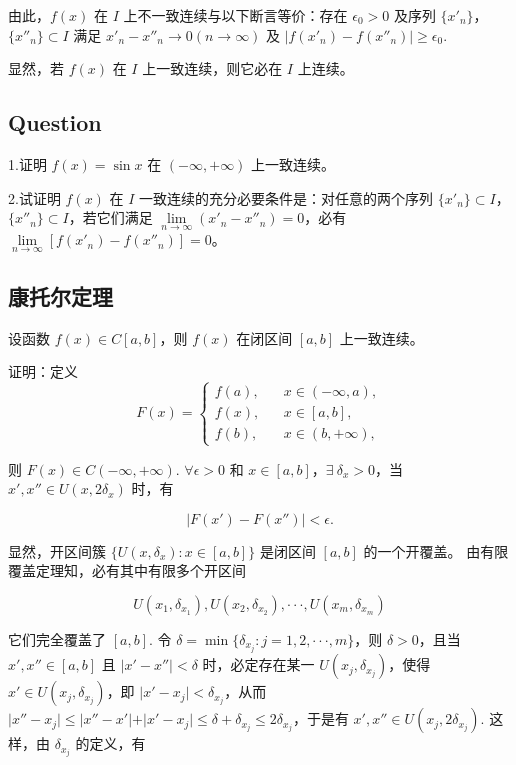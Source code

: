   由此，$f(x)$ 在 $I$ 上不一致连续与以下断言等价：存在 $\epsilon_0>0$ 及序列 $\{x'_n\}$，$\{x''_n\}\subset I$ 满足 $x'_n-x''_n\rightarrow0(n\rightarrow\infty)$ 及 $\vert f(x'_n)-f(x''_n)\vert\geq\epsilon_0$.

  显然，若 $f(x)$ 在 $I$ 上一致连续，则它必在 $I$ 上连续。

\subsection{Question}

1.证明 $f(x)=\sin x$ 在 $(-\infty,+\infty)$ 上一致连续。

2.试证明 $f(x)$ 在 $I$ 一致连续的充分必要条件是：对任意的两个序列 $\{x'_n\}\subset I$，$\{x''_n\}\subset I$，若它们满足 $\lim\limits_{n\rightarrow\infty}(x'_n-x''_n)=0$，必有 $\lim\limits_{n\rightarrow\infty}[f(x'_n)-f(x''_n)]=0$。

\subsection{康托尔定理}\label{sub_conff_1}

设函数 $f(x)\in C[a,b]$，则 $f(x)$ 在闭区间 $[a,b]$ 上一致连续。

证明：定义
$$
F(x)=\left\{
\begin{matrix}
f(a),\ \ \ \ &x\in(-\infty,a),\\
f(x),\ \ \ \ &x\in[a,b],\\
f(b),\ \ \ \ &x\in(b,+\infty),
\end{matrix}
\right.
$$

则 $F(x)\in C(-\infty,+\infty)$. $\forall \epsilon>0$ 和 $x\in[a,b]$，$\exists\ \delta_x>0$，当 $x',x''\in U(x,2\delta_x)$ 时，有

$$
\vert F(x')-F(x'')\vert<\epsilon.
$$

显然，开区间簇 $\{U(x,\delta_x):x\in[a,b]\}$ 是闭区间 $[a,b]$ 的一个开覆盖。 由有限覆盖定理知，必有其中有限多个开区间

$$
U(x_1,\delta_{x_1}),U(x_2,\delta_{x_2}),\cdot\cdot\cdot,U(x_m,\delta_{x_m})
$$

它们完全覆盖了 $[a,b]$. 令 $\delta=\min\{\delta_{x_j}:j=1,2,\cdot\cdot\cdot,m\}$，则 $\delta>0$，且当 $x',x''\in[a,b]$ 且 $\vert x'-x''\vert<\delta$ 时，必定存在某一 $U(x_j,\delta_{x_j})$，使得 $x'\in U(x_j,\delta_{x_j})$，即 $\vert x'-x_j\vert<\delta_{x_j}$，从而 $\vert x''-x_j\vert\leq\vert x''-x'\vert+\vert x'-x_j\vert\leq\delta+\delta_{x_j}\leq2\delta_{x_j}$，于是有 $x',x''\in U(x_j,2\delta_{x_j})$. 这样，由 $\delta_{x_j}$ 的定义，有

